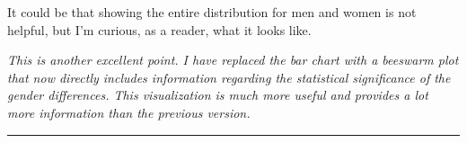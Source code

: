 It could be that showing the entire distribution for men and women is not helpful, but I’m curious, as a reader, what it looks like.

\textit{This is another excellent point. I have replaced the bar chart with a beeswarm plot that now directly includes information regarding the statistical significance of the gender differences. This visualization is much more useful and provides a lot more information than the previous version.}

\rule{\linewidth}{.01cm}